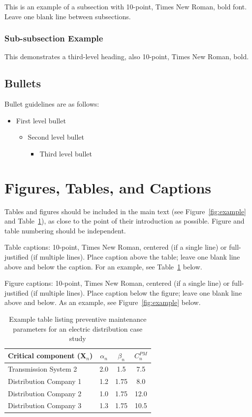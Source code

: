 \documentclass[10pt]{article}
\begin{document}
This is an example of a subsection with 10-point, Times New Roman, bold font. Leave one blank line between subsections.

\subsubsection{Sub-subsection Example}

This demonstrates a third-level heading, also 10-point, Times New Roman, bold.

\subsection{Bullets}

Bullet guidelines are as follows:

\begin{itemize}
    \item First level bullet
    \begin{itemize}
        \item Second level bullet
        \begin{itemize}
            \item Third level bullet
        \end{itemize}
    \end{itemize}
\end{itemize}

\section{Figures, Tables, and Captions}

Tables and figures should be included in the main text (see Figure~\ref{fig:example} and Table~\ref{tab:example}), as close to the point of their introduction as possible. Figure and table numbering should be independent.

Table captions: 10-point, Times New Roman, centered (if a single line) or full-justified (if multiple lines). Place caption above the table; leave one blank line above and below the caption. For an example, see Table~\ref{tab:example} below.

Figure captions: 10-point, Times New Roman, centered (if a single line) or full-justified (if multiple lines). Place caption below the figure; leave one blank line above and below. As an example, see Figure~\ref{fig:example} below.

\begin{table}[h!]
\centering
\caption{Example table listing preventive maintenance parameters for an electric distribution case study}
\begin{tabular}{|l|c|c|c|}
\hline
\textbf{Critical component (X$_n$)} & $\alpha_n$ & $\beta_n$ & $C_n^{PM}$ \\
\hline
Transmission System 2 & 2.0 & 1.5 & 7.5 \\
Distribution Company 1 & 1.2 & 1.75 & 8.0 \\
Distribution Company 2 & 1.0 & 1.75 & 12.0 \\
Distribution Company 3 & 1.3 & 1.75 & 10.5 \\
\hline
\end{tabular}
\label{tab:example}
\end{table}
\end{document}
